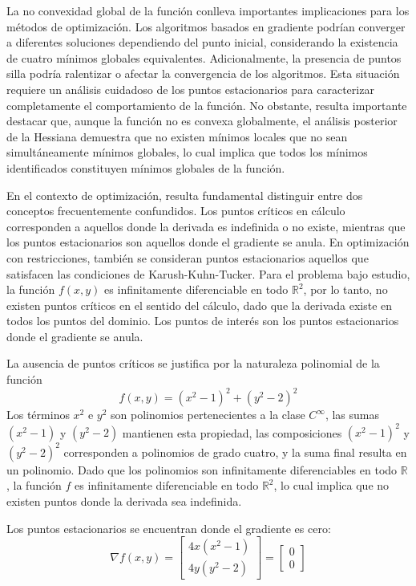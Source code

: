 \documentclass[12pt,a4paper]{article}
\begin{document}
La no convexidad global de la función conlleva importantes implicaciones para los métodos de optimización. Los algoritmos basados en gradiente podrían converger a diferentes soluciones dependiendo del punto inicial, considerando la existencia de cuatro mínimos globales equivalentes. Adicionalmente, la presencia de puntos silla podría ralentizar o afectar la convergencia de los algoritmos. Esta situación requiere un análisis cuidadoso de los puntos estacionarios para caracterizar completamente el comportamiento de la función. No obstante, resulta importante destacar que, aunque la función no es convexa globalmente, el análisis posterior de la Hessiana demuestra que no existen mínimos locales que no sean simultáneamente mínimos globales, lo cual implica que todos los mínimos identificados constituyen mínimos globales de la función.

En el contexto de optimización, resulta fundamental distinguir entre dos conceptos frecuentemente confundidos. Los puntos críticos en cálculo corresponden a aquellos donde la derivada es indefinida o no existe, mientras que los puntos estacionarios son aquellos donde el gradiente se anula. En optimización con restricciones, también se consideran puntos estacionarios aquellos que satisfacen las condiciones de Karush-Kuhn-Tucker. Para el problema bajo estudio, la función $f(x,y)$ es infinitamente diferenciable en todo $\mathbb{R}^2$, por lo tanto, no existen puntos críticos en el sentido del cálculo, dado que la derivada existe en todos los puntos del dominio. Los puntos de interés son los puntos estacionarios donde el gradiente se anula.

La ausencia de puntos críticos se justifica por la naturaleza polinomial de la función
\[f(x,y) = (x^2-1)^2 + (y^2-2)^2\]
Los términos $x^2$ e $y^2$ son polinomios pertenecientes a la clase $C^{\infty}$, las sumas $(x^2-1)$ y $(y^2-2)$ mantienen esta propiedad, las composiciones $(x^2-1)^2$ y $(y^2-2)^2$ corresponden a polinomios de grado cuatro, y la suma final resulta en un polinomio. Dado que los polinomios son infinitamente diferenciables en todo $\mathbb{R}$, la función $f$ es infinitamente diferenciable en todo $\mathbb{R}^2$, lo cual implica que no existen puntos donde la derivada sea indefinida.

Los puntos estacionarios se encuentran donde el gradiente es cero:
\[\nabla f(x,y) = \begin{bmatrix} 4x(x^2 - 1) \\ 4y(y^2 - 2) \end{bmatrix} = \begin{bmatrix} 0 \\ 0 \end{bmatrix}\]
\end{document}
